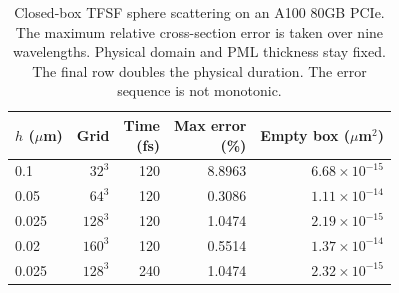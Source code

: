 \begin{table}[tbp]
\centering
\small
\renewcommand{\arraystretch}{1.15}
\caption{Closed-box TFSF sphere scattering on an A100 80GB PCIe. The maximum relative cross-section error is taken over nine wavelengths. Physical domain and PML thickness stay fixed. The final row doubles the physical duration. The error sequence is not monotonic.}
\label{tab:tfsf-sphere}
\begin{tabular}{@{}lrrrr@{}}
\toprule
$h$ ($\mu$m) & Grid & \shortstack{Time\\(fs)} & \shortstack{Max error\\(\%)} & \shortstack{Empty box\\($\mu$m$^2$)} \\
\midrule
0.1 & $32^3$ & 120 & 8.8963 & $6.68\times10^{-15}$ \\
0.05 & $64^3$ & 120 & 0.3086 & $1.11\times10^{-14}$ \\
0.025 & $128^3$ & 120 & 1.0474 & $2.19\times10^{-15}$ \\
0.02 & $160^3$ & 120 & 0.5514 & $1.37\times10^{-14}$ \\
0.025 & $128^3$ & 240 & 1.0474 & $2.32\times10^{-15}$ \\
\bottomrule
\end{tabular}
\end{table}
